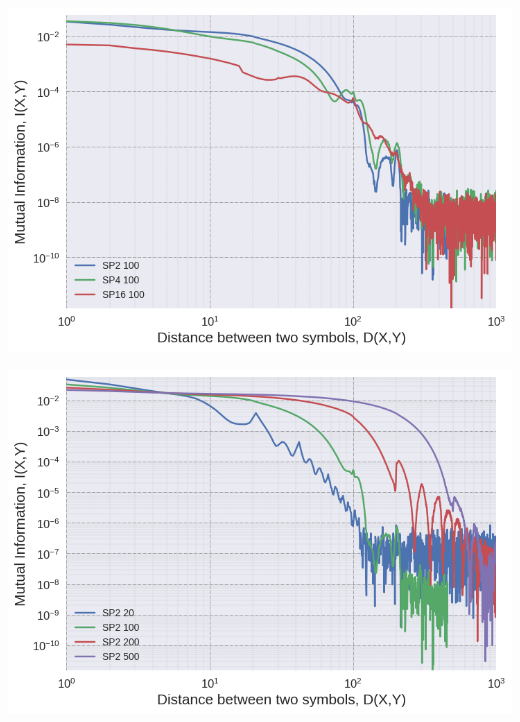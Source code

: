 \documentclass[a0,portrait]{a0poster}
\begin{document}
\begin{multicols}{2}
\begin{center}
\begin{minipage}[b]{0.45\linewidth}
\centering
\includegraphics[width=\textwidth]{spk_k.png}
\label{fig:spk_k}
\end{minipage}
\hspace{0.5cm}
\begin{minipage}[b]{0.45\linewidth}
\centering
\includegraphics[width=\textwidth]{spk_len.png}
\label{fig:spk_len}
\end{minipage}
\end{center}


\end{multicols}
\end{document}
